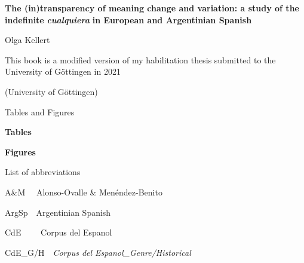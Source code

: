 
\clearpage\setcounter{page}{1}\begin{styleStandard}
\textbf{The (in)transparency of meaning change and variation: a study of the indefinite }\textbf{\textit{cualquiera}}\textbf{ in European and Argentinian Spanish}
\end{styleStandard}

\begin{styleStandard}
Olga Kellert
\end{styleStandard}

\begin{styleStandard}
This book is a modified version of my habilitation thesis submitted to the University of Göttingen in 2021
\end{styleStandard}

\begin{styleStandard}
(University of Göttingen)
\end{styleStandard}

\clearpage\begin{styleContentsHeading}
Tables and Figures
\end{styleContentsHeading}

\begin{styleelenconumeratoii}
\textbf{Tables}
\end{styleelenconumeratoii}

\clearpage\begin{styleelenconumeratoii}
\textbf{Figures}
\end{styleelenconumeratoii}

\clearpage\begin{styleContentsHeading}
List of abbreviations
\end{styleContentsHeading}

\begin{styleStandard}
A\&M \ \ Alonso-Ovalle \& Menéndez-Benito
\end{styleStandard}

\begin{styleStandard}
ArgSp\ \ Argentinian Spanish
\end{styleStandard}

\begin{styleStandard}
CdE \ \ \ \ Corpus del Espanol
\end{styleStandard}

\begin{styleStandard}
CdE\_G/H\ \ \textit{Corpus del Espanol\_Genre/Historical}
\end{styleStandard}

